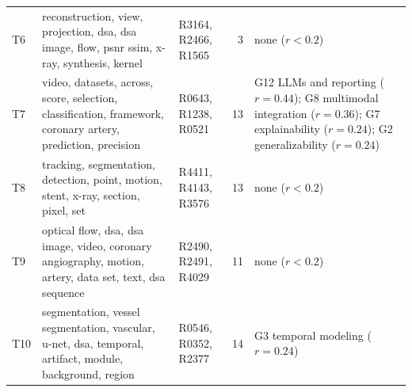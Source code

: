 \begin{longtable}{>{\raggedright\arraybackslash}p{0.7cm} >{\raggedright\arraybackslash}p{6.2cm} >{\raggedright\arraybackslash}p{2.9cm} r >{\raggedright\arraybackslash}p{4.2cm}}
T6 & reconstruction, view, projection, dsa, dsa image, flow, psnr ssim, x-ray, synthesis, kernel & R3164, R2466, R1565 & 3 & none ($r<0.2$)\\
T7 & video, datasets, across, score, selection, classification, framework, coronary artery, prediction, precision & R0643, R1238, R0521 & 13 & G12 LLMs and reporting ($r=0.44$); G8 multimodal integration ($r=0.36$); G7 explainability ($r=0.24$); G2 generalizability ($r=0.24$)\\
T8 & tracking, segmentation, detection, point, motion, stent, x-ray, section, pixel, set & R4411, R4143, R3576 & 13 & none ($r<0.2$)\\
T9 & optical flow, dsa, dsa image, video, coronary angiography, motion, artery, data set, text, dsa sequence & R2490, R2491, R4029 & 11 & none ($r<0.2$)\\
T10 & segmentation, vessel segmentation, vascular, u-net, dsa, temporal, artifact, module, background, region & R0546, R0352, R2377 & 14 & G3 temporal modeling ($r=0.24$)\\
\end{longtable}
